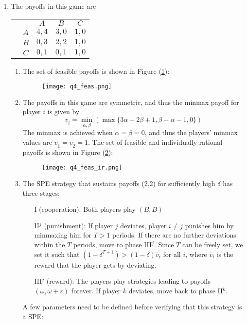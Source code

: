 \documentclass[11pt]{article}
\begin{document}
\begin{enumerate}
	\item The payoffs in this game are
	\begin{table}[!htbp]
		\centering
		\setlength{\extrarowheight}{2pt}
		\begin{tabular}{cc|c|c|c|}
			& \multicolumn{1}{c}{} & \multicolumn{1}{c}{$A$}  & \multicolumn{1}{c}{$B$} & \multicolumn{1}{c}{$ C $} \\\cline{3-5}
			& $A$ & $ 4,4 $ & $ 3,0 $ & $ 1,0 $\\\cline{3-5}
			& $B$ & $ 0,3 $ & $ 2,2 $ & $ 1,0 $\\\cline{3-5}
			& $C$ & $ 0,1 $ & $ 0,1 $ & $ 1,0 $\\\cline{3-5}
		\end{tabular}
	\end{table}
	\begin{enumerate}
		\item The set of feasible payoffs is shown in Figure (\ref{q4_feas}): 
		
		\begin{figure}[h]
			\centering
			\caption{}
			\texttt{[image: q4\_feas.png]}
			\label{q4_feas}
		\end{figure}
		
		\item The payoffs in this game are symmetric, and thus the minmax payoff for player $ i $ is given by 
		\[\underline{v}_i = \min_{\alpha, \beta} (\max\{3\alpha + 2\beta + 1, \beta - \alpha - 1, 0\})\]
		The minmax is achieved when $ \alpha = \beta = 0 $, and thus the players' minmax values are $ \underline{v}_1 = \underline{v}_2 = 1 $. The set of feasible and individually rational payoffs is shown in Figure (\ref{q4_feas_ir}): 
		\newpage
		\begin{figure}[h]
			\centering
			\caption{}
			\texttt{[image: q4\_feas\_ir.png]}
			\label{q4_feas_ir}
		\end{figure}
		
		\item The SPE strategy that sustains payoffs (2,2) for sufficiently high $\delta$ has three stages:
		\begin{itemize}
			\item [I] (cooperation): Both players play $ (B,B) $
			\item [II$ ^j $] (punishment): If player $ j $ deviates, player $ i\neq j $ punishes him by minmaxing him for $ T > 1 $ periods. If there are no further deviations within the $ T $ periods, move to phase III$ ^j $. Since $ T $ can be freely set, we set it such that $ (1 - \delta^{T + 1}) > (1 - \delta)\bar{v}_i $ for all $ i $, where $ \bar{v}_i $ is the reward that the player gets by deviating. 
			\item [III$ ^j $] (reward): The players play strategies leading to payoffs $ (\omega, \omega + \varepsilon) $ forever. If player $ k $ deviates, move back to phase II$ ^k $.
		\end{itemize}
		A few parameters need to be defined before verifying that this strategy is a SPE:
		

\end{enumerate}
\end{enumerate}
\end{document}
